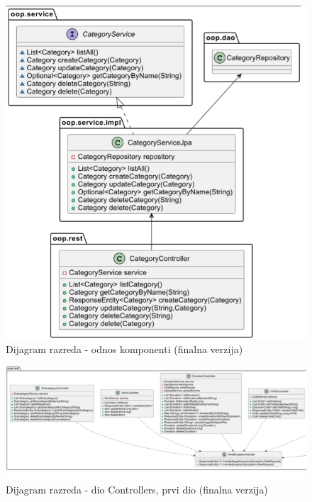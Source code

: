                 \begin{figure}[H]
				\includegraphics[width=\textwidth,height=0.8\textheight]{dijagrami/Odnos komponenti Final.png}
				\centering
				\caption{Dijagram razreda - odnos komponenti (finalna verzija)}
				\label{fig:OdnosKomponentiFinal}
			\end{figure}


                \begin{figure}[H]
				\includegraphics[width=\textwidth,height=0.4\textheight]{dijagrami/Controlleri Final Part1.png}
				\centering
				\caption{Dijagram razreda - dio Controllers, prvi dio (finalna verzija)}
				\label{fig:ControllersFinalPt1}
			\end{figure}

